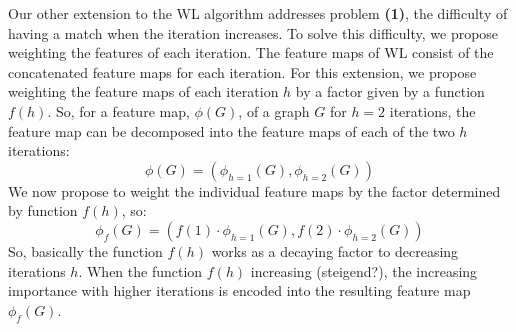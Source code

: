 
Our other extension to the WL algorithm addresses problem \textbf{(1)}, the difficulty of having a match when the iteration increases.
To solve this difficulty, we propose weighting the features of each iteration.
The feature maps of WL consist of the concatenated feature maps for each iteration.
For this extension, we propose weighting the feature maps of each iteration $h$ by a factor given by a function $f(h)$.
So, for a feature map, $\phi(G)$, of a graph $G$ for $h=2$ iterations, the feature map can be decomposed into the feature maps of each of the two $h$ iterations:
\begin{equation*}
\phi(G)=(\phi_{h=1}(G), \phi_{h=2}(G))
\end{equation*}
We now propose to weight the individual feature maps by the factor determined by function $f(h)$, so:
\begin{equation*}
\phi_{f}(G)=(f(1) \cdot \phi_{h=1}(G), f(2) \cdot \phi_{h=2}(G))
\end{equation*}
So, basically the function $f(h)$ works as a decaying factor to decreasing iterations $h$.
When the function $f(h)$ increasing (steigend?), the increasing importance with higher iterations is encoded into the resulting feature map $\phi_f(G)$.

